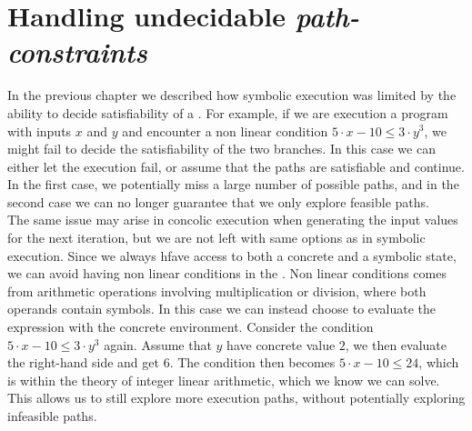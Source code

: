 \section{Handling undecidable \emph{path-constraints}} 
In the previous chapter we described how symbolic execution was limited by the ability to decide satisfiability of a \pc. For example, if we are execution a program with inputs $x$ and $y$ and encounter a non linear condition $ 5\cdot x - 10 \leq 3 \cdot y^3$, we might fail to decide the satisfiability of the two branches. In this case we can either let the execution fail, or assume that the paths are satisfiable and continue. In the first case, we potentially miss a large number of possible paths, and in the second case we can no longer guarantee that we only explore feasible paths.\\
The same issue may arise in concolic execution when generating the input values for the next iteration, but we are not left with same options as in symbolic execution. Since we always hfave access to both a concrete and a symbolic state, we can avoid having non linear conditions in the \pc. Non linear conditions comes from arithmetic operations involving multiplication or division, where both operands contain symbols. In this case we can instead choose to evaluate the expression with the concrete environment\cite{Godefroid:2005:DDA:1064978.1065036}. Consider the condition $ 5\cdot x - 10 \leq 3 \cdot y^3$ again. Assume that $y$ have concrete value $2$, we then evaluate the right-hand side and get $6$. The condition then becomes $ 5\cdot x - 10 \leq 24$, which is within the theory of integer linear arithmetic, which we know we can solve. This allows us to still explore more execution paths, without potentially exploring infeasible paths. 